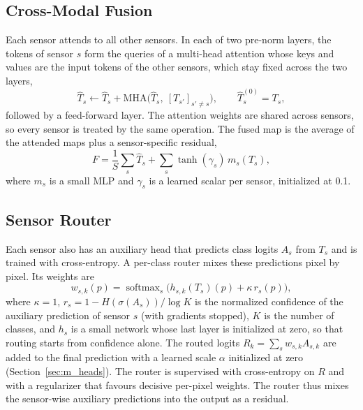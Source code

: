 \subsection{Cross-Modal Fusion}\label{sec:m_fusion}
Each sensor attends to all other sensors. In each of two pre-norm layers, the tokens of sensor $s$ form the queries of a multi-head attention whose keys and values are the input tokens of the other sensors, which stay fixed across the two layers,
\begin{equation}
\hat{T}_s \leftarrow \hat{T}_s + \mathrm{MHA}\big(\hat{T}_s,\ [T_{s'}]_{s'\neq s}\big), \qquad \hat{T}_s^{(0)} = T_s,
\end{equation}
followed by a feed-forward layer. The attention weights are shared across sensors, so every sensor is treated by the same operation. The fused map is the average of the attended maps plus a sensor-specific residual,
\begin{equation}
F = \frac{1}{S}\sum_{s}\hat{T}_s + \sum_{s}\tanh(\gamma_s)\, m_s(T_s),
\end{equation}
where $m_s$ is a small MLP and $\gamma_s$ is a learned scalar per sensor, initialized at 0.1.

\subsection{Sensor Router}\label{sec:m_router}
Each sensor also has an auxiliary head that predicts class logits $A_s$ from $T_s$ and is trained with cross-entropy. A per-class router mixes these predictions pixel by pixel. Its weights are
\begin{equation}
w_{s,k}(p) = \operatorname{softmax}_{s}\big( h_{s,k}(T_s)(p) + \kappa\, r_s(p) \big),
\end{equation}
where $\kappa=1$, $r_s = 1 - H(\sigma(A_s))/\log K$ is the normalized confidence of the auxiliary prediction of sensor $s$ (with gradients stopped), $K$ is the number of classes, and $h_s$ is a small network whose last layer is initialized at zero, so that routing starts from confidence alone. The routed logits $R_k=\sum_s w_{s,k} A_{s,k}$ are added to the final prediction with a learned scale $\alpha$ initialized at zero (Section~\ref{sec:m_heads}). The router is supervised with cross-entropy on $R$ and with a regularizer that favours decisive per-pixel weights. The router thus mixes the sensor-wise auxiliary predictions into the output as a residual.

